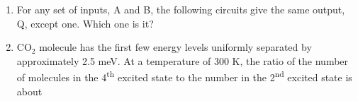 \documentclass[journal,12pt,onecolumn]{IEEEtran}
\theoremstyle{remark}
\begin{document}
\begin{enumerate}
\item For any set of inputs, A and B, the following circuits give the same output, Q, except one. Which one is it?\hfill{}

\begin{enumerate}  \end{enumerate}

\item CO$_2$ molecule has the first few energy levels uniformly separated by approximately 2.5 meV. At a temperature of 300 K, the ratio of the number of molecules in the 4\textsuperscript{th} excited state to the number in the 2\textsuperscript{nd} excited state is about\hfill{}

\begin{enumerate}  \end{enumerate}


\end{enumerate}
\end{document}
